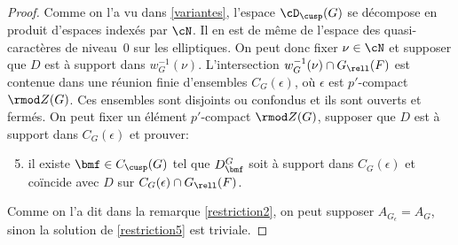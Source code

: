 \begin{proof}
Comme on l'a vu dans \ref{variantes}, l'espace $\cD_{\cusp}(G)$ se décompose en produit d'espaces indexés par $\cN$. Il en est de même de l'espace des quasi-caractères de niveau~$0$ sur les elliptiques. On peut donc fixer $\nu\in \cN$ et supposer que
$D$ est à support dans $w_{G}^{-1}(\nu)$. L'intersection $w_{G}^{-1}(\nu)\cap G_{\rell}(F)$ est contenue dans une réunion finie d'ensembles $ C_{G}(\epsilon )$, où $\epsilon$ est $p'$-compact $\rmod Z(G)$. Ces ensembles sont disjoints ou confondus et ils sont ouverts et fermés. On peut fixer un élément $p'$-compact $\rmod Z(G)$, supposer que $D$ est à support dans $ C_{G}(\epsilon)$ et prouver:
\begin{enumerate}\setcounter{enumi}{4}
\item\label{restriction5}
il existe $\bmf\in C_{\cusp}(G)$ tel que $D^G_{\bmf}$ soit à support dans $C_{G}(\epsilon)$ et coïncide avec $D$ sur $C_{G}(\epsilon)\cap G_{\rell}(F)$.
\end{enumerate}

Comme on l'a dit dans la remarque \eqref{restriction2}, on peut supposer $A_{G_{\epsilon}}=A_{G}$, sinon la solution de \eqref{restriction5} est triviale.


\end{proof}
